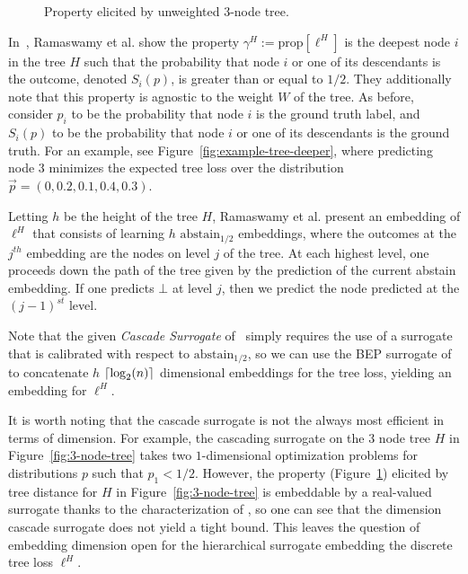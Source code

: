 \documentclass[12pt]{article}
\newcommand{\prop}[1]{\mathrm{prop}[#1]}
\newcommand{\abstain}[1]{\mathrm{abstain}_{#1}}
\DeclarePairedDelimiter\ceil{\lceil}{\rceil}
\begin{document}
\begin{figure}
\begin{minipage}{0.45\linewidth}
	\caption{Property elicited by unweighted 3-node tree.}
	\label{fig:3-node-tree-prop}
\end{minipage}
\end{figure}

In~\cite[Theorem 1]{ramaswamy2015hierarchical}, Ramaswamy et al. show the property $\gamma^H := \prop{\ell^H}$ is the deepest node $i$ in the tree $H$ such that the probability that node $i$ or one of its descendants is the outcome, denoted $S_i(p)$, is greater than or equal to $1/2$.
They additionally note that this property is agnostic to the weight $W$ of the tree.
As before, consider $p_i$ to be the probability that node $i$ is the ground truth label, and $S_i(p)$ to be the probability that node $i$ or one of its descendants is the ground truth.
For an example, see Figure~\ref{fig:example-tree-deeper}, where predicting node $3$ minimizes the expected tree loss over the distribution $\vec p = (0, 0.2, 0.1, 0.4, 0.3)$.

Letting $h$ be the height of the tree $H$, Ramaswamy et al. present an embedding of $\ell^H$ that consists of learning $h$ $\abstain{1/2}$ embeddings, where the outcomes at the $j^{th}$ embedding are the nodes on level $j$ of the tree.
At each highest level, one proceeds down the path of the tree given by the prediction of the current abstain embedding.
If one predicts $\bot$ at level $j$, then we predict the node predicted at the $(j-1)^{st}$ level.

Note that the given \emph{Cascade Surrogate} of~\citet[Equation 2]{ramaswamy2015hierarchical} simply requires the use of a surrogate that is calibrated with respect to $\abstain{1/2}$, so we can use the BEP surrogate of~\citet{ramaswamy2018consistent} to concatenate $h$ $\ceil{\log_2(n)}$ dimensional embeddings for the tree loss, yielding an embedding for $\ell^H$.

It is worth noting that the cascade surrogate is not the always most efficient in terms of dimension.
For example, the cascading surrogate on the 3 node tree $H$ in Figure~\ref{fig:3-node-tree} takes two $1$-dimensional optimization problems for distributions $p$ such that $p_1 < 1/2$.
However, the property (Figure~\ref{fig:3-node-tree-prop}) elicited by tree distance for $H$ in Figure~\ref{fig:3-node-tree} is embeddable by a real-valued surrogate thanks to the characterization of \cite[\S~3]{finocchiaro2020embedding}, so one can see that the dimension cascade surrogate does not yield a tight bound.
This leaves the question of embedding dimension open for the hierarchical surrogate embedding the discrete tree loss $\ell^H$.
\end{document}
